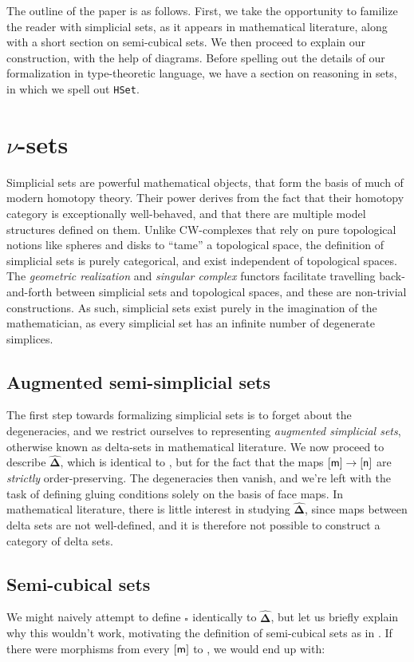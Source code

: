 \documentclass[10pt]{art}
\newcommand{\DeltaHat}{\ensuremath{\hat{\boldsymbol{\Delta}}}}
\newcommand{\Cube}[1]{\ensuremath{\boldsymbol{\square^{#1}}}}
\begin{document}
The outline of the paper is as follows. First, we take the opportunity to familize the reader with simplicial sets, as it appears in mathematical literature, along with a short section on semi-cubical sets. We then proceed to explain our construction, with the help of diagrams. Before spelling out the details of our formalization in type-theoretic language, we have a section on reasoning in sets, in which we spell out \texttt{HSet}.

\section{\texorpdfstring{$\nu$}{nu}-sets}
Simplicial sets are powerful mathematical objects, that form the basis of much of modern homotopy theory. Their power derives from the fact that their homotopy category is exceptionally well-behaved, and that there are multiple model structures defined on them. Unlike CW-complexes that rely on pure topological notions like spheres and disks to ``tame'' a topological space, the definition of simplicial sets is purely categorical, and exist independent of topological spaces. The \emph{geometric realization} and \emph{singular complex} functors facilitate travelling back-and-forth between simplicial sets and topological spaces, and these are non-trivial constructions. As such, simplicial sets exist purely in the imagination of the mathematician, as every simplicial set has an infinite number of degenerate simplices.

\subsection{Augmented semi-simplicial sets}
The first step towards formalizing simplicial sets is to forget about the degeneracies, and we restrict ourselves to representing \emph{augmented simplicial sets}, otherwise known as delta-sets in mathematical literature. We now proceed to describe \DeltaHat, which is identical to \Simplex{}, but for the fact that the maps $\mathsf{[m]} \rightarrow \mathsf{[n]}$ are \emph{strictly} order-preserving. The degeneracies then vanish, and we're left with the task of defining gluing conditions solely on the basis of face maps. In mathematical literature, there is little interest in studying \DeltaHat, since maps between delta sets are not well-defined, and it is therefore not possible to construct a category of delta sets.

\subsection{Semi-cubical sets}
We might naively attempt to define $\Cube{}$ identically to \DeltaHat, but let us briefly explain why this wouldn't work, motivating the definition of semi-cubical sets as in \cite{Antolini00}. If there were morphisms from every $\mathsf{[m]}$ to , we would end up with:
\end{document}
